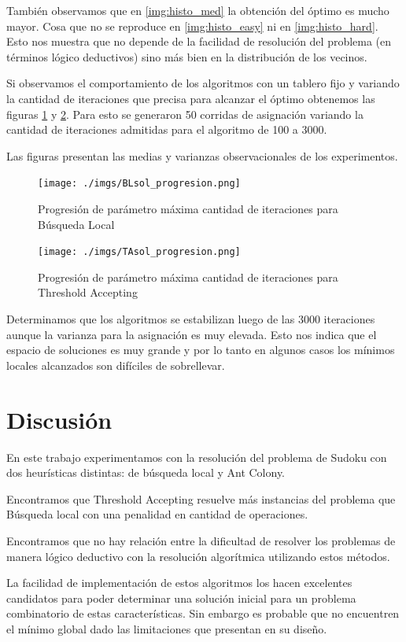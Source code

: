 \documentclass[a4paper,spanish]{article}
\begin{document}
También observamos que en \ref{img:histo_med} la obtención del óptimo es mucho
mayor. Cosa que no se reproduce en \ref{img:histo_easy} ni en
\ref{img:histo_hard}. Esto nos muestra que no depende de la facilidad de
resolución del problema (en términos lógico deductivos) sino más bien en la
distribución de los vecinos.

Si observamos el comportamiento de los algoritmos con un tablero fijo y variando
la cantidad de iteraciones que precisa para alcanzar el óptimo obtenemos las
figuras \ref{img:prog_ls} y \ref{img:prog_ta}. Para esto se generaron 50
corridas de asignación variando la cantidad de iteraciones admitidas para el
algoritmo de 100 a 3000.

Las figuras presentan las medias y varianzas observacionales de los
experimentos.


\begin{center}
    \begin{figure}[H]
        \texttt{[image: ./imgs/BLsol\_progresion.png]}
        \caption{Progresión de parámetro máxima cantidad de iteraciones para Búsqueda Local}
        \label{img:prog_ls}
    \end{figure}
\end{center}


\begin{center}
    \begin{figure}[H]
        \texttt{[image: ./imgs/TAsol\_progresion.png]}
        \caption{Progresión de parámetro máxima cantidad de iteraciones para
        Threshold Accepting}
        \label{img:prog_ta}
    \end{figure}
\end{center}

Determinamos que los algoritmos se estabilizan luego de las 3000 iteraciones
aunque la varianza para la asignación es muy elevada. Esto nos indica que el
espacio de soluciones es muy grande y por lo tanto en algunos casos los mínimos locales
alcanzados son difíciles de sobrellevar.



\section{Discusión}

En este trabajo experimentamos con la resolución del problema de Sudoku con dos
heurísticas distintas: de búsqueda local y Ant Colony.

Encontramos que Threshold Accepting resuelve más instancias del problema que
Búsqueda local con una penalidad en cantidad de operaciones.

Encontramos que no hay relación entre la dificultad de resolver los problemas de
manera lógico deductivo con la resolución algorítmica utilizando estos métodos.

La facilidad de implementación de estos algoritmos los hacen excelentes
candidatos para poder determinar una solución inicial para un problema
combinatorio de estas características. Sin embargo es probable que no encuentren
el mínimo global dado las limitaciones que presentan en su diseño.

\clearpage


\end{document}
